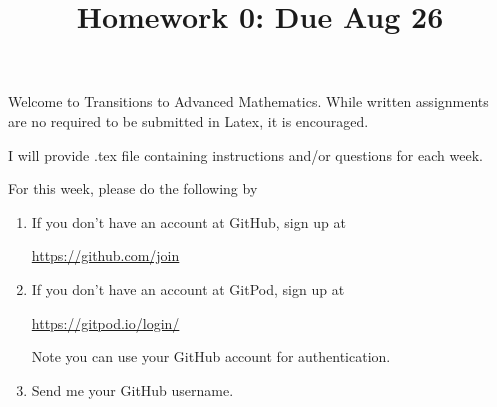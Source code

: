 \documentclass[12pt]{amsart}
\theoremstyle{definition}
\begin{document}
\title{Homework 0: Due Aug 26}

\maketitle

Welcome to Transitions to Advanced Mathematics. While written assignments are no required to be 
submitted in Latex, it is encouraged. 

I will provide .tex file containing instructions and/or questions for each week. 

For this week, please do the following by

\begin{enumerate}
	\item If you don't have an account at GitHub, sign up at 
		\begin{center}
			\href{https://github.com/join}{https://github.com/join}
		\end{center}
		
	\item If you don't have an account at GitPod, sign up at 
		\begin{center}
			\href{https://gitpod.io/login/}{https://gitpod.io/login/}
		\end{center}
	Note you can use your GitHub account for authentication. 
			
	\item Send me your GitHub username. 
\end{enumerate}
\end{document}
